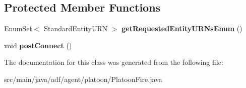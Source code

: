 \subsection*{Protected Member Functions}
\begin{DoxyCompactItemize}
\item 
\hypertarget{classadf_1_1agent_1_1platoon_1_1PlatoonFire_a4ced1ed81d2af29b147f621b8da66df9}{}\label{classadf_1_1agent_1_1platoon_1_1PlatoonFire_a4ced1ed81d2af29b147f621b8da66df9} 
Enum\+Set$<$ Standard\+Entity\+U\+RN $>$ {\bfseries get\+Requested\+Entity\+U\+R\+Ns\+Enum} ()
\item 
\hypertarget{classadf_1_1agent_1_1platoon_1_1PlatoonFire_a9cae59f50fcee0b5e41d20095d1a062a}{}\label{classadf_1_1agent_1_1platoon_1_1PlatoonFire_a9cae59f50fcee0b5e41d20095d1a062a} 
void {\bfseries post\+Connect} ()
\end{DoxyCompactItemize}


The documentation for this class was generated from the following file\+:\begin{DoxyCompactItemize}
\item 
src/main/java/adf/agent/platoon/Platoon\+Fire.\+java\end{DoxyCompactItemize}
